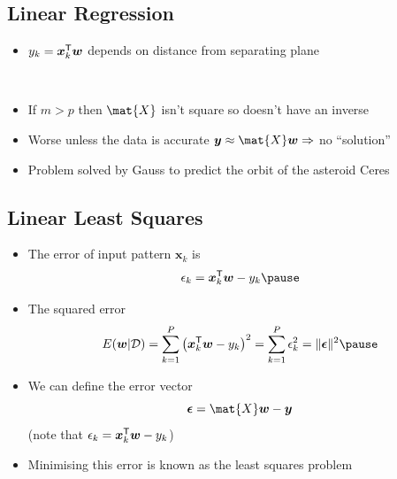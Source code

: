 \documentclass[25pt,landscape,footrule]{foils}
\begin{document}
\begin{slide}
\section[-2]{Linear Regression}

\pb
\begin{itemize}\squeeze
\item $y_k = \bm{x}_k^{\textsf{T}} \bm{w}$ depends on distance from separating
  plane\pauseh{}
\vspace*{-1cm}
\begin{center}
\pause\\
\vspace*{-0.5cm}
\end{center}
\item If $m>p$ then $\mat{X}$ isn't square so doesn't have an inverse\pauseh
\item Worse unless the data is accurate $\bm{y} \approx \mat{X}
  \bm{w}\Rightarrow$ no ``solution''\pauseh
\item Problem solved by Gauss to predict the orbit of the asteroid Ceres\pauseh
\end{itemize}
\end{slide}


\begin{slide}
\section[-1.5]{Linear Least Squares}

\begin{PauseHighLight}

\begin{itemize}\squeeze
\item The error of input pattern $\bm{x}_k$ is
  \begin{displaymath}
    \epsilon_k  = \bm{x}_k^\tr \bm{w}-y_k\pause
  \end{displaymath}
\item The squared error
  \begin{displaymath}
    E(\bm{w}|\mathcal{D}) = 
    \sum_{k=1}^P\left(\bm{x}_k^\tr \bm{w}-y_k\right)^2
    = \sum_{k=1}^P \epsilon_k^2 = \| \bm{\epsilon} \|^2 \pause
  \end{displaymath}
\item We can define the error vector
  \begin{displaymath}
    \bm{\epsilon} = \mat{X} \bm{w} - \bm{y}
  \end{displaymath}
(note that $\epsilon_k = \bm{x}_k^{\textsf{T}} \bm{w} -y_k$)\pause
\item Minimising this error is known as the least squares problem\pause
\end{itemize}

\end{PauseHighLight}
\end{slide}
\end{document}
